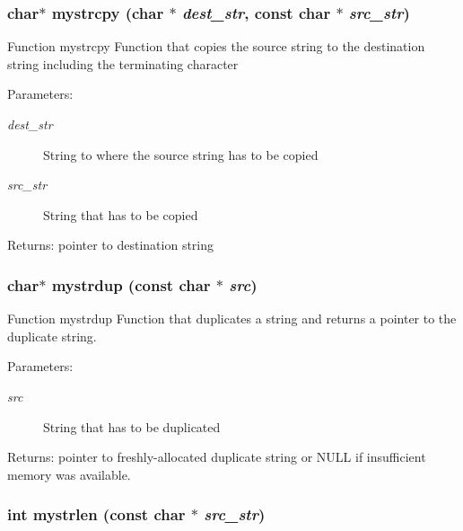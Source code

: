 \subsubsection{\setlength{\rightskip}{0pt plus 5cm}char$\ast$ mystrcpy (char $\ast$ {\em dest\_\-str}, const char $\ast$ {\em src\_\-str})}\label{mystring_8h_4ca137dfdc47bfb151a5263f25710227}


Function mystrcpy Function that copies the source string to the destination string including the terminating character \begin{Desc}
\item[Parameters:]
\begin{description}
\item[{\em dest\_\-str}]String to where the source string has to be copied \item[{\em src\_\-str}]String that has to be copied \end{description}
\end{Desc}
\begin{Desc}
\item[Returns:]pointer to destination string \end{Desc}
\subsubsection{\setlength{\rightskip}{0pt plus 5cm}char$\ast$ mystrdup (const char $\ast$ {\em src})}\label{mystring_8h_e4d69f24eeedc25d4a7abe09f6656cc2}


Function mystrdup Function that duplicates a string and returns a pointer to the duplicate string. \begin{Desc}
\item[Parameters:]
\begin{description}
\item[{\em src}]String that has to be duplicated \end{description}
\end{Desc}
\begin{Desc}
\item[Returns:]pointer to freshly-allocated duplicate string or NULL if insufficient memory was available. \end{Desc}
\subsubsection{\setlength{\rightskip}{0pt plus 5cm}int mystrlen (const char $\ast$ {\em src\_\-str})}\label{mystring_8h_477287d2512917d6190c5c2543805cfb}



